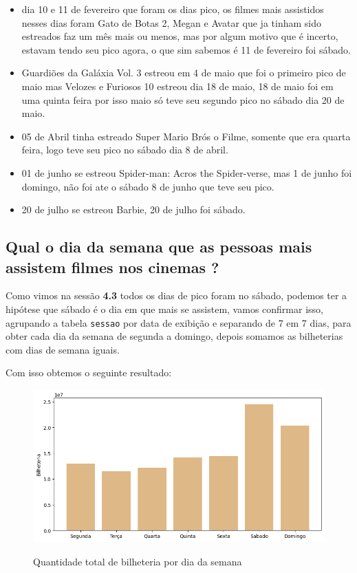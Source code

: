 \documentclass[12pt, a4paper]{article}
\begin{document}
\begin{itemize}

    \item dia 10 e 11 de fevereiro que foram os dias pico, os filmes mais assistidos nesses dias foram Gato de Botas 2, Megan e Avatar que ja tinham sido estreados faz um mês mais ou menos, mas por algum motivo que é incerto, estavam tendo seu pico agora, o que sim sabemos é 11 de fevereiro foi sábado.
    \item Guardiões da Galáxia Vol. 3 estreou em 4 de maio que foi o primeiro pico de maio mas Velozes e Furiosos 10 estreou dia 18 de maio, 18 de maio foi em uma quinta feira por isso maio só teve seu segundo pico no sábado dia 20 de maio.
    \item05 de Abril tinha estreado Super Mario Brós o Filme, somente que era quarta feira, logo teve seu pico no sábado dia 8 de abril.
    \item01 de junho se estreou Spider-man: Acros the Spider-verse, mas 1 de junho foi domingo, não foi ate o sábado 8 de junho que teve seu pico.
    \item20 de julho se estreou Barbie, 20 de julho foi sábado.
\end{itemize}

\subsection{Qual o dia da semana que as pessoas mais assistem filmes nos cinemas ?}

Como vimos na sessão \textbf{4.3} todos os dias de pico foram no sábado, podemos ter a hipótese que sábado é o dia em que mais se assistem, vamos confirmar isso, agrupando a tabela \texttt{sessao} por data de exibição e separando de 7 em 7 dias, para obter cada dia da semana de segunda a domingo, depois somamos as bilheterias com dias de semana iguais.

Com isso obtemos o seguinte resultado:

\newpage

\begin{figure}[h]
    \centering
    \includegraphics[width=1\textwidth]{bilheteria_dia_semana.png}%
    \label{fig:bilhetereria_dia_semana}
    \caption{Quantidade total de bilheteria por dia da semana }
\end{figure}
\end{document}
